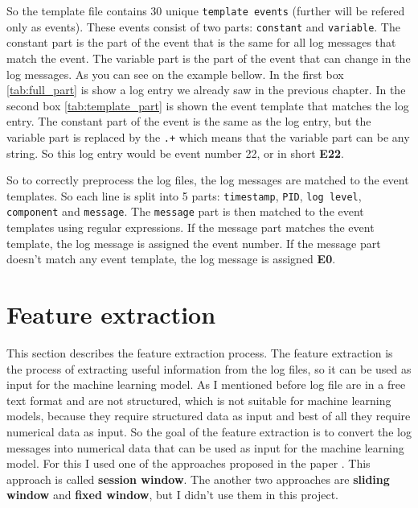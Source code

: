 So the template file contains 30 unique \texttt{template events} (further will be refered only as events). These events consist of two parts: \texttt{constant} and \texttt{variable}. 
The constant part is the part of the event that is the same for all log messages that match the event. The variable part is the part of the event that can change in the log messages. 
As you can see on the example bellow. In the first box \ref{tab:full_part} is show a log entry we already saw in the previous chapter. 
In the second box \ref{tab:template_part} is shown the event template that matches the log entry. 
The constant part of the event is the same as the log entry, but the variable part is replaced by the \texttt{.+} which means that the variable part can be any string. So this log 
entry would be event number 22, or in short \textbf{E22}.

\begin{center}
    \label{tab:full_part}
\end{center}

\begin{center}
    \label{tab:template_part}
\end{center}

So to correctly preprocess the log files, the log messages are matched to the event templates.
So each line is split into 5 parts: \texttt{timestamp}, \texttt{PID}, \texttt{log level}, \texttt{component} and \texttt{message}. The \texttt{message} part is then matched to the event templates 
using regular expressions. If the message part matches the event template, the log message is assigned the event number. If the message part doesn't match any event template, the log message is assigned \textbf{E0}.

\section{Feature extraction} \label{feature}

This section describes the feature extraction process. The feature extraction is the process of extracting useful information from the log files, so it can be used as input for the machine learning model.
As I mentioned before log file are in a free text format and are not structured, which is not suitable for machine learning models, because they require structured data as input and 
best of all they require numerical data as input. So the goal of the feature extraction is to convert the log messages into numerical data that can be used as input for the machine learning model.
For this I used one of the approaches proposed in the paper \cite{loglizer}. This approach is called \textbf{session window}. The another two approaches are \textbf{sliding window} and \textbf{fixed window}, but I didn't use them in this project.

